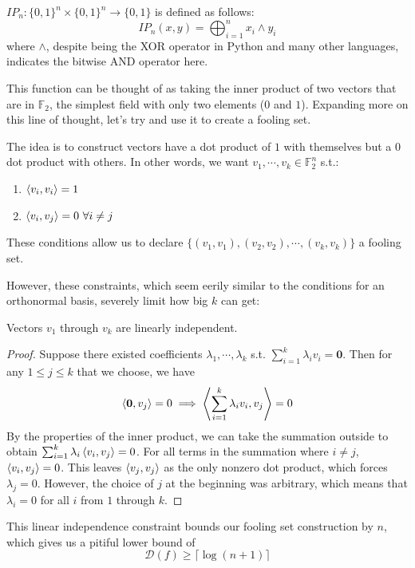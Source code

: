 \documentclass[letterpaper]{article}
\begin{document}
\begin{example}
    $IP_n: \{0, 1\}^n \times \{0, 1\}^n \to \{0, 1\}$ is defined as follows:
    \[IP_n(x, y)=\bigoplus_{i=1}^n x_i \land y_i\]
    where $\land$, despite being the XOR operator in Python and many other
    languages, indicates the bitwise AND operator here.

    This function can be thought of as taking the inner product of two vectors
    that are in $\mathbb{F}_2$, the simplest field with only two elements ($0$ and $1$).
    Expanding more on this line of thought, let's try and use it to create
    a fooling set.

    The idea is to construct vectors have a dot product of $1$ with themselves
    but a $0$ dot product with others.
    In other words, we want $v_1, \cdots, v_k \in \mathbb{F}_2^n$ s.t.:
    \begin{enumerate}
        \item $\braket{v_i, v_i}=1$
        \item $\braket{v_i, v_j}=0\ \forall i \ne j$
    \end{enumerate}
    These conditions allow us to declare
    $\{(v_1, v_1), (v_2, v_2), \cdots, (v_k, v_k)\}$ a fooling set.

    However, these constraints, which seem eerily similar to the conditions
    for an orthonormal basis, severely limit how big $k$ can get:
    \begin{claim}
        Vectors $v_1$ through $v_k$ are linearly independent.
    \end{claim}
    \begin{proof}
        Suppose there existed coefficients $\lambda_1, \cdots, \lambda_k$
        s.t. $\sum_{i=1}^{k} \lambda_i v_i = \mathbf{0}$.
        Then for any $1 \le j \le k$ that we choose, we have
        \[\Braket{\mathbf{0}, v_j}=0 \implies \Braket{\sum_{i=1}^{k} \lambda_i v_i, v_j}=0\]
        By the properties of the inner product, we can take the summation
        outside to obtain $\sum_{i=1}^{k} \lambda_i\Braket{v_i, v_j}=0$.
        For all terms in the summation where $i \ne j$, $\Braket{v_i, v_j}=0$.
        This leaves $\Braket{v_j, v_j}$ as the only nonzero dot product,
        which forces $\lambda_j=0$.
        However, the choice of $j$ at the beginning was arbitrary,
        which means that $\lambda_i=0$ for all $i$ from $1$ through $k$.
    \end{proof}
    This linear independence constraint bounds our fooling set construction
    by $n$, which gives us a pitiful lower bound of
    \[\mathcal{D}(f) \ge \lceil\log(n+1)\rceil\]
\end{example}
\end{document}
